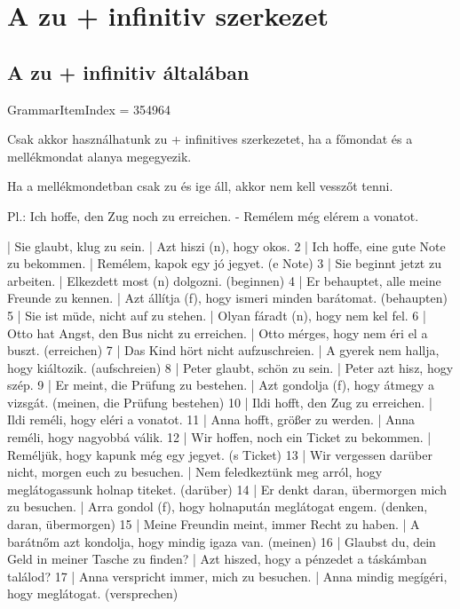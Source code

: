 \documentclass{article}
\newenvironment{desc}{\verbatim}{\endverbatim}
\newenvironment{exmp}{\verbatim}{\endverbatim}
\begin{document}
\section{A zu + infinitiv szerkezet}

\subsection{A zu + infinitiv általában}

GrammarItemIndex = 354964

\begin{desc}
Csak akkor használhatunk zu + infinitives szerkezetet, ha a főmondat és a mellékmondat alanya megegyezik.

Ha a mellékmondetban csak zu és ige áll, akkor nem kell vesszőt tenni.

Pl.: Ich hoffe, den Zug noch zu erreichen. - Remélem még elérem a vonatot.
\end{desc}

\begin{exmp}
1 | Sie glaubt, klug zu sein. | Azt hiszi (n), hogy okos.
2 | Ich hoffe, eine gute Note zu bekommen. | Remélem, kapok egy jó jegyet. (e Note)
3 | Sie beginnt jetzt zu arbeiten. | Elkezdett most (n) dolgozni. (beginnen)
4 | Er behauptet, alle meine Freunde zu kennen. | Azt állítja (f), hogy ismeri minden barátomat. (behaupten)
5 | Sie ist müde, nicht auf zu stehen. | Olyan fáradt (n), hogy nem kel fel.
6 | Otto hat Angst, den Bus nicht zu erreichen. | Otto mérges, hogy nem éri el a buszt. (erreichen)
7 | Das Kind hört nicht aufzuschreien. | A gyerek nem hallja, hogy kiáltozik. (aufschreien)
8 | Peter glaubt, schön zu sein. | Peter azt hisz, hogy szép.
9 | Er meint, die Prüfung zu bestehen. | Azt gondolja (f), hogy átmegy a vizsgát. (meinen, die Prüfung bestehen)
10 | Ildi hofft, den Zug zu erreichen. | Ildi reméli, hogy eléri a vonatot.
11 | Anna hofft, größer zu werden. | Anna reméli, hogy nagyobbá válik.
12 | Wir hoffen, noch ein Ticket zu bekommen. | Reméljük, hogy kapunk még egy jegyet. (s Ticket)
13 | Wir vergessen darüber nicht, morgen euch zu besuchen. | Nem feledkeztünk meg arról, hogy meglátogassunk holnap titeket. (darüber)
14 | Er denkt daran, übermorgen mich zu besuchen. | Arra gondol (f), hogy holnapután meglátogat engem. (denken, daran, übermorgen)
15 | Meine Freundin meint, immer Recht zu haben. | A barátnőm azt kondolja, hogy mindig igaza van. (meinen)
16 | Glaubst du, dein Geld in meiner Tasche zu finden? | Azt hiszed, hogy a pénzedet a táskámban találod?
17 | Anna verspricht immer, mich zu besuchen. | Anna mindig megígéri, hogy meglátogat. (versprechen)
\end{exmp}
\end{document}
